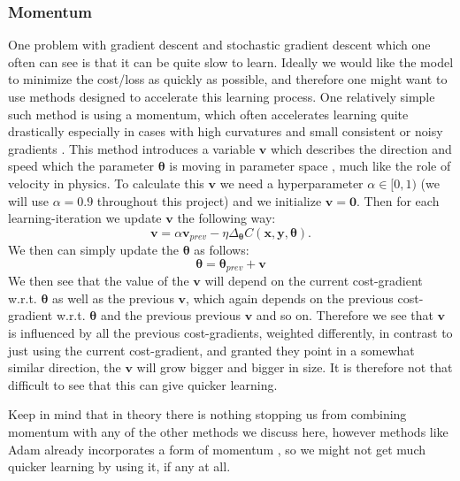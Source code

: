 \documentclass{article}
\begin{document}
\subsubsection{Momentum}
One problem with gradient descent and stochastic gradient descent which one
often can see is that it can be quite slow to learn. Ideally we would like the
model to minimize the cost/loss as quickly as possible, and therefore one might
want to use methods designed to accelerate this learning process. One relatively
simple such method is using a momentum, which often accelerates learning quite
drastically especially in cases with high curvatures and small consistent or
noisy gradients \cite[s.~8.3.2]{goodfellow2016deep}. This method introduces a
variable $\bm{v}$ which describes the direction and speed which the parameter
$\bm{\theta}$ is moving in parameter space \cite[s.~8.3.2]{goodfellow2016deep}, much
like the role of velocity in physics. To calculate this $\bm{v}$ we need a
hyperparameter $\alpha \in [0, 1)$ (we will use $\alpha = 0.9$ throughout this
project) and we initialize $\bm{v} = \bm{0}$. Then for each learning-iteration
we update $\bm{v}$ the following way:
$$\bm{v} = \alpha \bm{v}_{prev} - \eta \Delta_{\bm{\theta}} C(\bm{x}, \bm{y}, \bm{\theta}).$$
We then can simply update the $\bm{\theta}$ as follows:
$$\bm{\theta} = \bm{\theta}_{prev} + \bm{v}$$
We then see that the value of the $\bm{v}$ will depend on the current cost-gradient
w.r.t. $\bm{\theta}$ as well as the previous $\bm{v}$, which again depends on
the previous cost-gradient w.r.t. $\bm{\theta}$ and the previous previous
$\bm{v}$ and so on. Therefore we see that $\bm{v}$ is influenced by all the
previous cost-gradients, weighted differently, in contrast to just using the
current cost-gradient, and granted they point in a somewhat similar direction,
the $\bm{v}$ will grow bigger and bigger in size. It is therefore not that
difficult to see that this can give quicker learning.


Keep in mind that in theory there is nothing stopping us from combining momentum
with any of the other methods we discuss here, however methods like Adam already
incorporates a form of momentum \cite[s.~8.5.3]{goodfellow2016deep}, so we might
not get much quicker learning by using it, if any at all.
\end{document}
